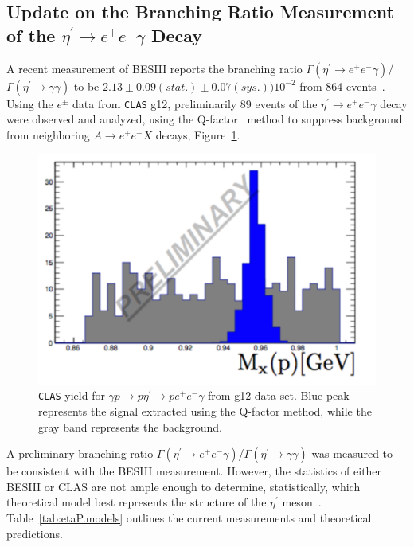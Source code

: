 \documentclass{aip-cp}
\begin{document}
\subsection{Update on the Branching Ratio Measurement  of the $\eta^\prime \rightarrow e^+e^-\gamma$ Decay}
A recent measurement of BESIII reports the branching ratio $\Gamma(\eta^{\prime} \to  e^+ e^-  \gamma)$/$\Gamma(\eta^{\prime} \to  \gamma  \gamma)$ to be $2.13\pm0.09(stat.)\pm0.07(sys.))10^{-2}$ from 864 events~\cite{bib7}.  Using the $e^{\pm}$ data from \textsc{\texttt{CLAS}} g12, preliminarily 89 events of the $\eta^{\prime} \to  e^+ e^-  \gamma$ decay were observed and analyzed, using the Q-factor~\cite{bib8} method to suppress background from neighboring $A \to e^+ e^-  X$ decays, Figure~\ref{fig:etaP_ff}.
 \begin{figure}[h!]
 	\centerline{\includegraphics[width=160 pt]{figures/clas_etaP_ff_II.pdf}}
 	\caption{\textsc{\texttt{CLAS}} yield for $\gamma p \to p \eta^{\prime}  \to p e^+ e^- \gamma $ from g12 data set. Blue peak represents the signal extracted using the Q-factor method, while the gray band represents the background.}
 	\label{fig:etaP_ff}
 \end{figure}
  A preliminary branching ratio $\Gamma(\eta^{\prime} \to  e^+ e^-  \gamma)$/$\Gamma(\eta^{\prime} \to  \gamma  \gamma)$ was measured to be consistent with the BESIII measurement. However, the statistics of either BESIII or CLAS are not ample enough to determine, statistically, which theoretical model best represents the structure of the $\eta^{\prime}$ meson~\cite{bib10,bib11,bib12}. Table~\ref{tab:etaP.models} outlines the current measurements and theoretical predictions.

%
\end{document}
